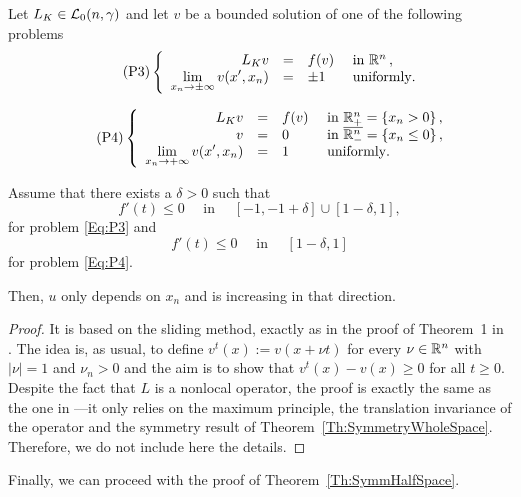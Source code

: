 \begin{proposition}
\label{Prop:HalfSpaceLimUnif}
Let $L_K \in \mathcal{L}_0(n,\gamma)$ and let $v$ be a bounded solution of one of the following problems
\begin{equation}
\leqnomode
\tag{P3}
\label{Eq:P3}
\beqc{\PDEsystem}
L_K  v &=& f(v)  &\textrm{ in }\R^n\,,\\
\ds \lim_{x_n \to \pm \infty} v(x',x_n) &=& \pm 1 \,\,\, &\textrm{ uniformly}.
\eeqc
\end{equation}

\begin{equation}
\leqnomode
\tag{P4}
\label{Eq:P4}
\beqc{\PDEsystem}
L_K  v &=& f(v)  &\textrm{ in }\R^n_+ = \{ x_n>0\} \,,\\
v &=& 0  &\textrm{ in }\overline{\R^n_-} = \{ x_n\leq 0\}\,,\\
\ds \lim_{x_n \to + \infty} v(x',x_n) &=& 1 \,\,\, &\textrm{ uniformly}.
\eeqc
\end{equation}

\reqnomode

Assume that there exists a $\delta > 0$ such that
$$ f'(t) \leq 0 \quad \text{ in } \quad [-1,-1+\delta]\cup[1-\delta,1], $$
for problem \eqref{Eq:P3} and
$$ f'(t) \leq 0 \quad \text{ in } \quad [1-\delta,1] $$
for problem \eqref{Eq:P4}.

Then, $u$ only depends on $x_n$ and is increasing in that direction.
\end{proposition}

\begin{proof}
It is based on the sliding method, exactly as in the proof of Theorem~1 in \cite{BerestyckiHamelMonneau}. The idea is, as usual,   to define $ v^t(x) := v(x+\nu t) $ for every $\nu\in\mathbb{R}^n$ with $|\nu|=1$ and $\nu_n>0$ and the aim is to show that $v^t(x)-v(x)\geq 0$ for all $t\geq 0$. Despite the fact that $L$ is a nonlocal operator, the proof is exactly the same as the one in \cite{BerestyckiHamelMonneau} ---it only relies on the maximum principle, the translation invariance of the operator and the symmetry result of Theorem~\ref{Th:SymmetryWholeSpace}. Therefore, we do not include here the details.
\end{proof}






Finally, we can proceed with the proof of Theorem~\ref{Th:SymmHalfSpace}.

